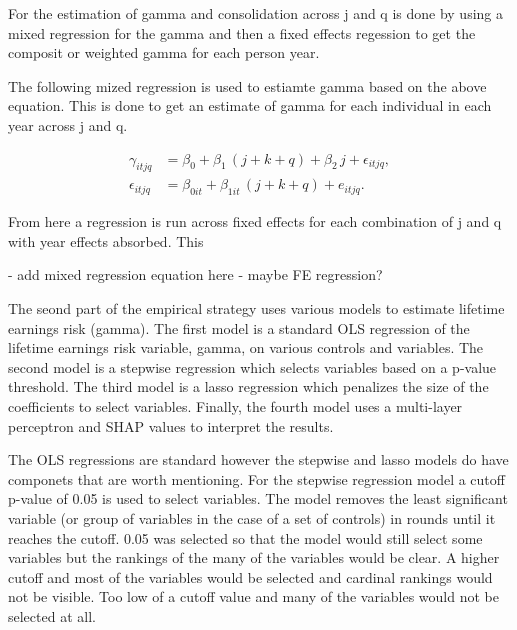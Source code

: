 \documentclass[12pt]{article}
\begin{document}
\begin{onehalfspace}
For the estimation of gamma and consolidation across j and q is done by using a mixed regression for the gamma and then a fixed effects regession to get the composit or weighted gamma for each person year.

The following mized regression is used to estiamte gamma based on the above equation. This is done to get an estimate of gamma for each individual in each year across j and q. 



\begin{align}
\gamma_{itjq}
&= \beta_{0}
  + \beta_{1}\,(j + k + q)
  + \beta_{2}\,j
  + \epsilon_{itjq}, \\[1ex]
\epsilon_{itjq}
&= \beta_{0it}
  + \beta_{1it}\,(j + k + q)
  + e_{itjq}.
\end{align}




From here a regression is run across fixed effects for each combination of j and q with year effects absorbed. This 



- add mixed regression equation here
- maybe FE regression?







The seond part of the empirical strategy uses various models to estimate lifetime earnings risk (gamma). The first model is a standard OLS regression of the lifetime earnings risk variable, gamma, on various controls and variables. The second model is a stepwise regression which selects variables based on a p-value threshold. The third model is a lasso regression which penalizes the size of the coefficients to select variables. Finally, the fourth model uses a multi-layer perceptron and SHAP values to interpret the results.

The OLS regressions are standard however the stepwise and lasso models do have componets that are worth mentioning. For the stepwise regression model a cutoff p-value of 0.05 is used to select variables. The model removes the least significant variable (or group of variables in the case of a set of controls) in rounds until it reaches the cutoff. 0.05 was selected so that the model would still select some variables but the rankings of the many of the variables would be clear. A higher cutoff and most of the variables would be selected and cardinal rankings would not be visible. Too low of a cutoff value and many of the variables would not be selected at all. 


\end{onehalfspace}
\end{document}
